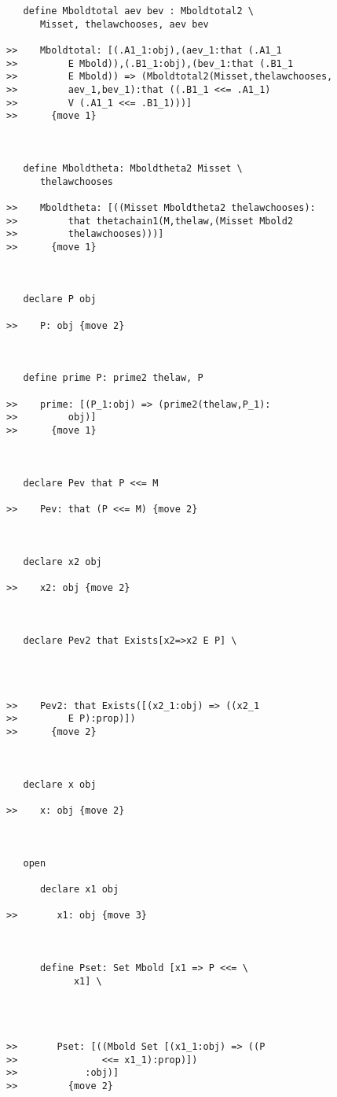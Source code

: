 \documentclass[12pt]{article}
\begin{document}
\begin{verbatim}
   define Mboldtotal aev bev : Mboldtotal2 \
      Misset, thelawchooses, aev bev

>>    Mboldtotal: [(.A1_1:obj),(aev_1:that (.A1_1
>>         E Mbold)),(.B1_1:obj),(bev_1:that (.B1_1
>>         E Mbold)) => (Mboldtotal2(Misset,thelawchooses,
>>         aev_1,bev_1):that ((.B1_1 <<= .A1_1)
>>         V (.A1_1 <<= .B1_1)))]
>>      {move 1}



   define Mboldtheta: Mboldtheta2 Misset \
      thelawchooses

>>    Mboldtheta: [((Misset Mboldtheta2 thelawchooses):
>>         that thetachain1(M,thelaw,(Misset Mbold2
>>         thelawchooses)))]
>>      {move 1}



   declare P obj

>>    P: obj {move 2}



   define prime P: prime2 thelaw, P

>>    prime: [(P_1:obj) => (prime2(thelaw,P_1):
>>         obj)]
>>      {move 1}



   declare Pev that P <<= M

>>    Pev: that (P <<= M) {move 2}



   declare x2 obj

>>    x2: obj {move 2}



   declare Pev2 that Exists[x2=>x2 E P] \
      



>>    Pev2: that Exists([(x2_1:obj) => ((x2_1
>>         E P):prop)])
>>      {move 2}



   declare x obj

>>    x: obj {move 2}



   open

      declare x1 obj

>>       x1: obj {move 3}



      define Pset: Set Mbold [x1 => P <<= \
            x1] \
         



>>       Pset: [((Mbold Set [(x1_1:obj) => ((P
>>               <<= x1_1):prop)])
>>            :obj)]
>>         {move 2}




\end{verbatim}
\end{document}

